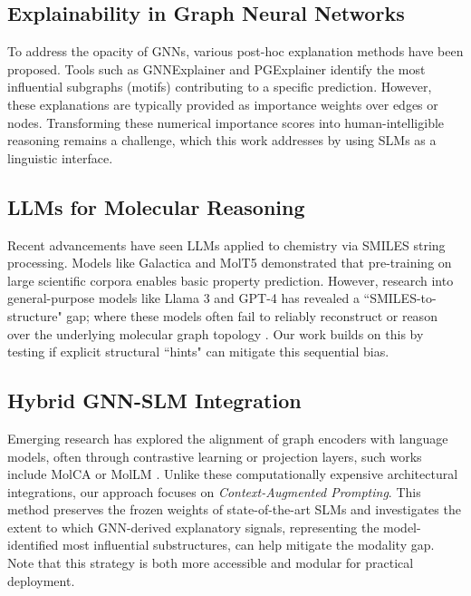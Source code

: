 \documentclass[
]{ceurart}
\begin{document}
\subsection{Explainability in Graph Neural Networks}
To address the opacity of GNNs, various post-hoc explanation methods have been proposed. Tools such as GNNExplainer \cite{Ying2019} and PGExplainer \cite{Luo2020} identify the most influential subgraphs (motifs) contributing to a specific prediction. However, these explanations are typically provided as importance weights over edges or nodes. Transforming these numerical importance scores into human-intelligible reasoning remains a challenge, which this work addresses by using SLMs as a linguistic interface.

\subsection{LLMs for Molecular Reasoning}
Recent advancements have seen LLMs applied to chemistry via SMILES string processing. Models like Galactica \cite{Taylor2022} and MolT5 \cite{Edwards2022} demonstrated that pre-training on large scientific corpora enables basic property prediction. However, research into general-purpose models like Llama 3 and GPT-4 has revealed a ``SMILES-to-structure" gap; where these models often fail to reliably reconstruct or reason over the underlying molecular graph topology \cite{chembert}. Our work builds on this by testing if explicit structural ``hints" can mitigate this sequential bias.

\subsection{Hybrid GNN-SLM Integration}
Emerging research has explored the alignment of graph encoders with language models, often through contrastive learning or projection layers, such works include MolCA \cite{Molca} or MolLM \cite{MolLM}. Unlike these computationally expensive architectural integrations, our approach focuses on \textit{Context-Augmented Prompting}. This method preserves the frozen weights of state-of-the-art SLMs and investigates the extent to which GNN-derived explanatory signals, representing the model-identified most influential substructures, can help mitigate the modality gap. Note that this strategy is both more accessible and modular for practical deployment.




\end{document}
